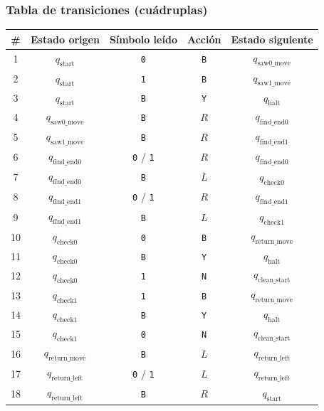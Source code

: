 \documentclass[11pt,letterpaper]{article}
\begin{document}
\subsubsection{Tabla de transiciones (cuádruplas)}
\begin{table}[h!]
\centering
\footnotesize
\begin{tabular}{ccccc}
\toprule
\textbf{\#} & \textbf{Estado origen} & \textbf{Símbolo leído} & \textbf{Acción} & \textbf{Estado siguiente} \\
\midrule
1 & $q_{\text{start}}$ & \texttt{0} & \texttt{B} & $q_{\text{saw0\_move}}$ \\
2 & $q_{\text{start}}$ & \texttt{1} & \texttt{B} & $q_{\text{saw1\_move}}$ \\
3 & $q_{\text{start}}$ & \texttt{B} & \texttt{Y} & $q_{\text{halt}}$ \\
\midrule
4 & $q_{\text{saw0\_move}}$ & \texttt{B} & $R$ & $q_{\text{find\_end0}}$ \\
5 & $q_{\text{saw1\_move}}$ & \texttt{B} & $R$ & $q_{\text{find\_end1}}$ \\
\midrule
6 & $q_{\text{find\_end0}}$ & \texttt{0} / \texttt{1} & $R$ & $q_{\text{find\_end0}}$ \\
7 & $q_{\text{find\_end0}}$ & \texttt{B} & $L$ & $q_{\text{check0}}$ \\
8 & $q_{\text{find\_end1}}$ & \texttt{0} / \texttt{1} & $R$ & $q_{\text{find\_end1}}$ \\
9 & $q_{\text{find\_end1}}$ & \texttt{B} & $L$ & $q_{\text{check1}}$ \\
\midrule
10 & $q_{\text{check0}}$ & \texttt{0} & \texttt{B} & $q_{\text{return\_move}}$ \\
11 & $q_{\text{check0}}$ & \texttt{B} & \texttt{Y} & $q_{\text{halt}}$ \\
12 & $q_{\text{check0}}$ & \texttt{1} & \texttt{N} & $q_{\text{clean\_start}}$ \\
13 & $q_{\text{check1}}$ & \texttt{1} & \texttt{B} & $q_{\text{return\_move}}$ \\
14 & $q_{\text{check1}}$ & \texttt{B} & \texttt{Y} & $q_{\text{halt}}$ \\
15 & $q_{\text{check1}}$ & \texttt{0} & \texttt{N} & $q_{\text{clean\_start}}$ \\
\midrule
16 & $q_{\text{return\_move}}$ & \texttt{B} & $L$ & $q_{\text{return\_left}}$ \\
17 & $q_{\text{return\_left}}$ & \texttt{0} / \texttt{1} & $L$ & $q_{\text{return\_left}}$ \\
18 & $q_{\text{return\_left}}$ & \texttt{B} & $R$ & $q_{\text{start}}$ \\

\end{tabular}
\end{table}
\end{document}
